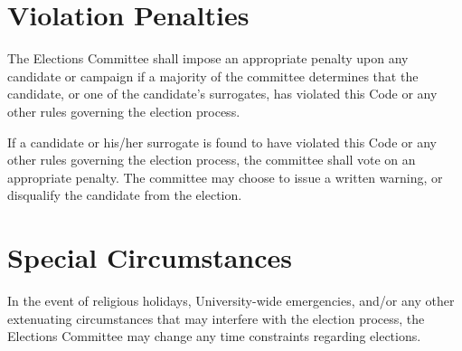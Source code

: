 \section{Violation Penalties}
\begin{bylaws-number}
  \item The Elections Committee shall impose an appropriate penalty upon any candidate or campaign if a majority of the committee determines that the candidate, or one of the candidate’s surrogates, has violated this Code or any other rules governing the election process.
  \item If a candidate or his/her surrogate is found to have violated this Code or any other rules governing the election process, the committee shall vote on an appropriate penalty. The committee may choose to issue a written warning, or disqualify the candidate from the election.
\end{bylaws-number}

\section{Special Circumstances}
In the event of religious holidays, University-wide emergencies, and/or any other extenuating circumstances that may interfere with the election process, the Elections Committee may change any time constraints regarding elections.

